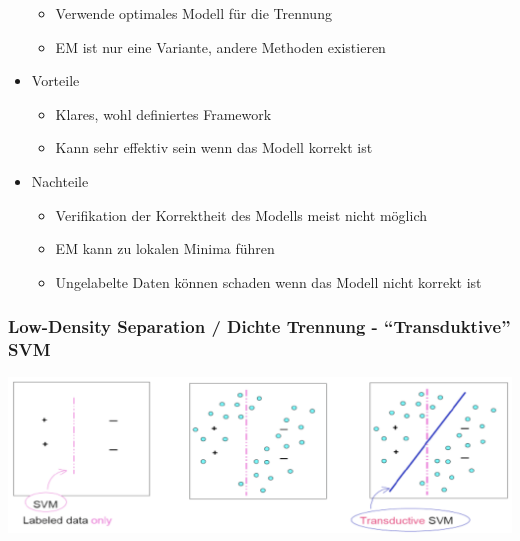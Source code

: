\documentclass[paper=a4, fontsize=11pt]{scrartcl} %
\numberwithin{equation}{section} %
\numberwithin{figure}{section} %
\numberwithin{table}{section} %
\begin{document}
\begin{itemize}
\begin{itemize}
\item Verwende optimales Modell für die Trennung
\item EM ist nur eine Variante, andere Methoden existieren
\end{itemize}
\item Vorteile
\begin{itemize}
\item Klares, wohl definiertes Framework
\item Kann sehr effektiv sein wenn das Modell korrekt ist
\end{itemize}
\item Nachteile
\begin{itemize}
\item Verifikation der Korrektheit des Modells meist nicht möglich
\item EM kann zu lokalen Minima führen
\item Ungelabelte Daten können schaden wenn das Modell nicht korrekt ist
\end{itemize}
\end{itemize}

\subsubsection{Low-Density Separation / Dichte Trennung - ``Transduktive'' SVM}

\includegraphics[width=\textwidth]{imgs/transsvm}
\end{document}

